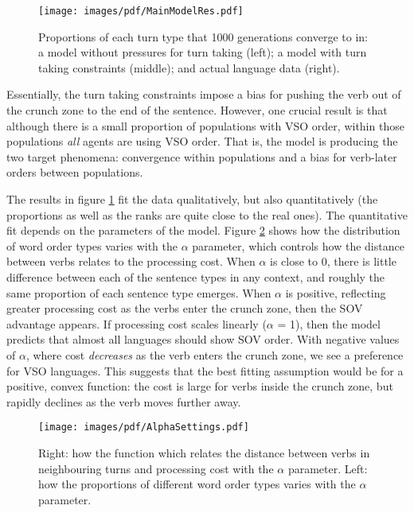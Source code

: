 \documentclass[12pt]{article}
\begin{document}
\begin{figure}[htbp]
\begin{center}
\texttt{[image: images/pdf/MainModelRes.pdf]}
\caption{Proportions of each turn type that 1000 generations converge to in:  a model without pressures for turn taking (left); a model with turn taking constraints (middle); and actual language data (right).}
\label{fig:MainModelResults}
\end{center}
\end{figure}

Essentially, the turn taking constraints impose a bias for pushing the verb out of the crunch zone to the end of the sentence.  However, one crucial result is that although there is a small proportion of populations with VSO order, within those populations \emph{all} agents are using VSO order.  That is, the model is producing the two target phenomena: convergence within populations and a bias for verb-later orders between populations.

The results in figure \ref{fig:MainModelResults} fit the data qualitatively, but also quantitatively (the proportions as well as the ranks are quite close to the real ones).  The quantitative fit depends on the parameters of the model.  Figure \ref{fig:Alpha} shows how the distribution of word order types varies with the $\alpha$ parameter, which controls how the distance between verbs relates to the processing cost.  When $\alpha$ is close to 0, there is little difference between each of the sentence types in any context, and roughly the same proportion of each sentence type emerges.  When $\alpha$ is positive, reflecting greater processing cost as the verbs enter the crunch zone, then the SOV advantage appears.  If processing cost scales linearly ($\alpha$ = 1), then the model predicts that almost all languages should show SOV order.  With negative values of $\alpha$, where cost \emph{decreases} as the verb enters the crunch zone, we see a preference for VSO languages.  This suggests that the best fitting assumption would be for a positive, convex function: the cost is large for verbs inside the crunch zone, but rapidly declines as the verb moves further away.  

\begin{figure}[htbp]
\begin{center}
\texttt{[image: images/pdf/AlphaSettings.pdf]}
\caption{Right: how the function which relates the distance between verbs in neighbouring turns and processing cost with the $\alpha$ parameter.  Left: how the proportions of different word order types varies with the $\alpha$ parameter.}
\label{fig:Alpha}
\end{center}
\end{figure}
\end{document}

